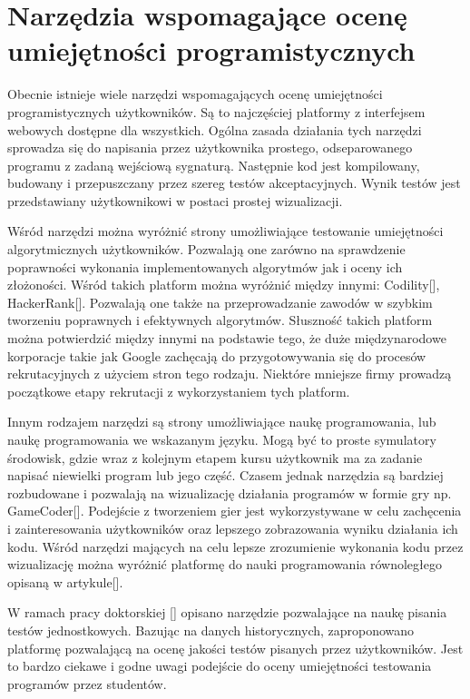 \section{Narzędzia wspomagające ocenę umiejętności programistycznych}

Obecnie istnieje wiele narzędzi wspomagających ocenę umiejętności programistycznych użytkowników.
Są to najczęściej platformy z interfejsem webowych dostępne dla wszystkich.
Ogólna zasada działania tych narzędzi sprowadza się do napisania przez użytkownika prostego, odseparowanego programu z zadaną wejściową sygnaturą.
Następnie kod jest kompilowany, budowany i przepuszczany przez szereg testów akceptacyjnych.
Wynik testów jest przedstawiany użytkownikowi w postaci prostej wizualizacji.

Wśród narzędzi można wyróżnić strony umożliwiające testowanie umiejętności algorytmicznych użytkowników.
Pozwalają one zarówno na sprawdzenie poprawności wykonania implementowanych algorytmów jak i oceny ich
złożoności.
Wśród takich platform można wyróżnić między innymi: Codility[], HackerRank[]. 
Pozwalają one także na przeprowadzanie zawodów w szybkim tworzeniu poprawnych i efektywnych algorytmów. 
Słuszność takich platform można potwierdzić między innymi na podstawie tego, że duże międzynarodowe korporacje takie jak Google zachęcają do przygotowywania się do procesów rekrutacyjnych z użyciem stron tego rodzaju. 
Niektóre mniejsze firmy prowadzą początkowe etapy rekrutacji z wykorzystaniem tych platform.

Innym rodzajem narzędzi są strony umożliwiające naukę programowania, lub naukę programowania we wskazanym języku. 
Mogą być to proste symulatory środowisk, gdzie wraz z kolejnym etapem kursu użytkownik ma za zadanie napisać niewielki program lub jego część.
Czasem jednak narzędzia są bardziej rozbudowane i pozwalają na wizualizację działania programów w formie gry np. GameCoder[].
Podejście z tworzeniem gier jest wykorzystywane w celu zachęcenia i zainteresowania użytkowników oraz lepszego zobrazowania wyniku działania ich kodu.
Wśród narzędzi mających na celu lepsze zrozumienie wykonania kodu przez wizualizację można wyróżnić platformę do nauki programowania równoległego opisaną w artykule[].

W ramach pracy doktorskiej [] opisano narzędzie pozwalające na naukę pisania testów jednostkowych.
Bazując na danych historycznych, zaproponowano platformę pozwalającą na ocenę jakości testów pisanych przez użytkowników.
Jest to bardzo ciekawe i godne uwagi podejście do oceny umiejętności testowania programów przez studentów.

